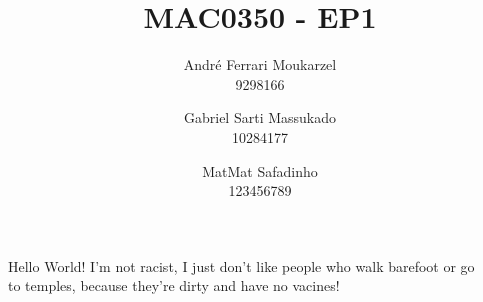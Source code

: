 \documentclass{article}
\title{MAC0350 - EP1}
\date{}
\author{
	André Ferrari Moukarzel \\ 9298166
	\and 
	Gabriel Sarti Massukado \\ 10284177
	\and
	MatMat Safadinho \\ 123456789
}
\begin{document}
  \maketitle
  \newpage

  Hello World! I'm not racist, I just don't like people who walk barefoot or go\\
  to temples, because they're dirty and have no vacines!
\end{document}
